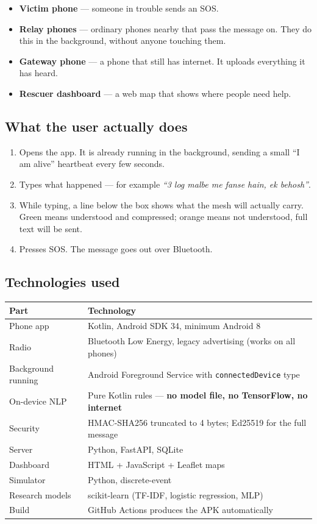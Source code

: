 \documentclass[11pt,a4paper]{article}
\begin{document}
\begin{itemize}
\item \textbf{Victim phone} --- someone in trouble sends an SOS.
\item \textbf{Relay phones} --- ordinary phones nearby that pass the message on.
      They do this in the background, without anyone touching them.
\item \textbf{Gateway phone} --- a phone that still has internet. It uploads
      everything it has heard.
\item \textbf{Rescuer dashboard} --- a web map that shows where people need help.
\end{itemize}

\subsection{What the user actually does}

\begin{enumerate}
\item Opens the app. It is already running in the background, sending a small
      ``I am alive'' heartbeat every few seconds.
\item Types what happened --- for example \emph{``3 log malbe me fanse hain,
      ek behosh''}.
\item While typing, a line below the box shows what the mesh will actually
      carry. Green means understood and compressed; orange means not
      understood, full text will be sent.
\item Presses SOS. The message goes out over Bluetooth.
\end{enumerate}

\subsection{Technologies used}

\begin{center}
\begin{tabular}{p{3.6cm} p{10.5cm}}
\toprule
\textbf{Part} & \textbf{Technology} \\
\midrule
Phone app & Kotlin, Android SDK 34, minimum Android 8 \\
Radio & Bluetooth Low Energy, legacy advertising (works on all phones) \\
Background running & Android Foreground Service with \texttt{connectedDevice} type \\
On-device NLP & Pure Kotlin rules --- \textbf{no model file, no TensorFlow, no internet} \\
Security & HMAC-SHA256 truncated to 4 bytes; Ed25519 for the full message \\
Server & Python, FastAPI, SQLite \\
Dashboard & HTML + JavaScript + Leaflet maps \\
Simulator & Python, discrete-event \\
Research models & scikit-learn (TF-IDF, logistic regression, MLP) \\
Build & GitHub Actions produces the APK automatically \\
\bottomrule
\end{tabular}
\end{center}
\end{document}
